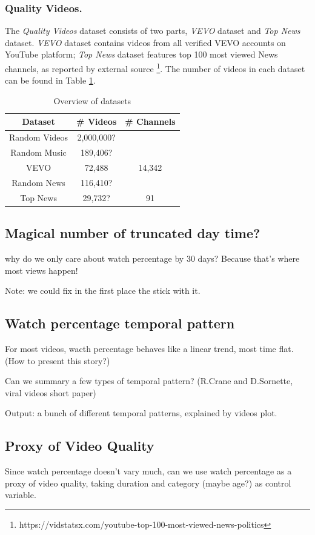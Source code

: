 \documentclass[letterpaper]{article}
\begin{document}
\subsubsection{Quality Videos.} The \textit{Quality Videos} dataset consists of two parts, \textit{VEVO} dataset and \textit{Top News} dataset. \textit{VEVO} dataset contains videos from all verified VEVO accounts on YouTube platform; \textit{Top News} dataset features top 100 most viewed News channels, as reported by external source \footnote{https://vidstatsx.com/youtube-top-100-most-viewed-news-politics}. The number of videos in each dataset can be found in Table \ref{table:1}.

\begin{table}[h!]
\centering
\begin{tabular}{|c||c|c|} 
 \hline
 Dataset & \# Videos & \# Channels \\ 
 \hline\hline
 Random Videos & 2,000,000? & \\ 
 Random Music & 189,406? & \\
 VEVO & 72,488 & 14,342 \\
 Random News & 116,410? & \\
 Top News & 29,732? & 91 \\ 
 \hline
\end{tabular}
\caption{Overview of datasets}
\label{table:1}
\end{table}


\subsection{Magical number of truncated day time?}
why do we only care about watch percentage by 30 days? Because that's where most views happen!

Note: we could fix in the first place the stick with it.


\subsection{Watch percentage temporal pattern}

For most videos, wacth percentage behaves like a linear trend, most time flat. (How to present this story?)

Can we summary a few types of temporal pattern? (R.Crane and D.Sornette, viral videos short paper)

Output: a bunch of different temporal patterns, explained by videos plot.


\subsection{Proxy of Video Quality}
Since watch percentage doesn't vary much, can we use watch percentage as a proxy of video quality, taking duration and category (maybe age?) as control variable.
\end{document}
